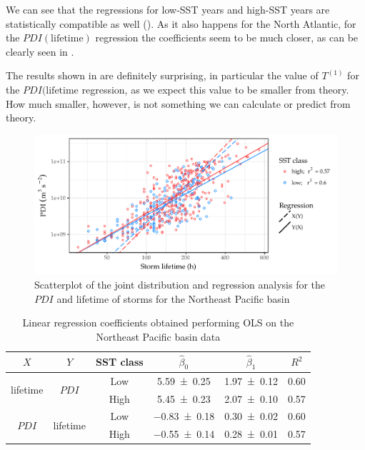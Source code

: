 \medskip
We can see that the regressions for low-SST years and high-SST years are statistically compatible as well (). As it also happens for the North Atlantic, for the $PDI(\text{lifetime})$ regression the coefficients seem to be much closer, as can be clearly seen in .

The results shown in  are definitely surprising, in particular the value of $T^{(1)}$ for the $PDI(\text{lifetime}$ regression, as we expect this value to be smaller from theory. How much smaller, however, is not something we can calculate or predict from theory.

\begin{figure}[H]
	\centering
	\includegraphics[width=\textwidth]{images/scatterplot-epac}
	\caption{Scatterplot of the joint distribution and regression analysis for the $PDI$ and lifetime of storms for the Northeast Pacific basin}
	\label{fig:epac-scatterplot}
\end{figure}

\begin{table}[H]
	\centering
	\begin{tabular}{cccccc}
		\toprule
		\toprule
		$X$ & $Y$ & SST class & $\hat{\beta}_{0}$ & $\hat{\beta}_{1}$ & $R^{2}$ \\
		\midrule
		\multirow{2}{*}{lifetime} & \multirow{2}{*}{$PDI$}
		 & Low  & \num{ 5.59 \pm 0.25} & \num{1.97 \pm 0.12} & \num{0.60} \\ %
		&& High & \num{ 5.45 \pm 0.23} & \num{2.07 \pm 0.10} & \num{0.57} \\ %
		\midrule
		\multirow{2}{*}{$PDI$} & \multirow{2}{*}{lifetime}
		 & Low  & \num{-0.83 \pm 0.18} & \num{0.30 \pm 0.02} & \num{0.60} \\ %
		&& High & \num{-0.55 \pm 0.14} & \num{0.28 \pm 0.01} & \num{0.57} \\ %
		\bottomrule
	\end{tabular}
	\caption{Linear regression coefficients obtained performing OLS on the Northeast Pacific basin data}
	\label{tab:epac-ols-coefs}
\end{table}

